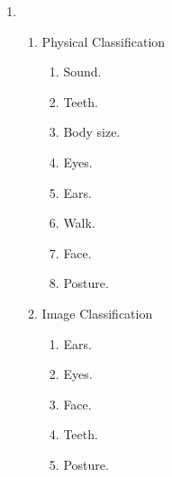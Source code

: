 \documentclass[10pt]{article}
\begin{document}
\begin{enumerate}
	\item 
		\begin{enumerate}
			\item Physical Classification 
				\begin{enumerate}
					\item Sound.
					\item Teeth.
					\item Body size.
					\item Eyes.
					\item Ears.
					\item Walk.
					\item Face.
					\item Posture.
				\end{enumerate}
			\item Image Classification
				\begin{enumerate}
					\item Ears.
					\item Eyes.
					\item Face.
					\item Teeth.
					\item Posture.
				\end{enumerate}


\end{enumerate}
\end{enumerate}
\end{document}
